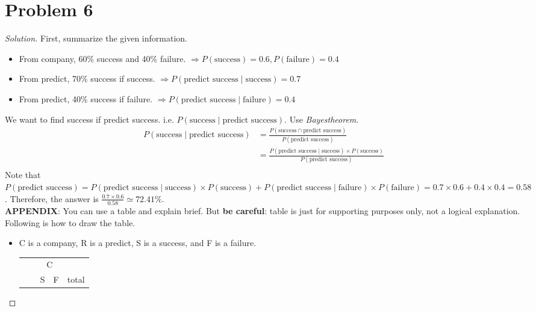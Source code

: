 \section*{Problem 6}
	\begin{proof} [Solution]
		First, summarize the given information.
		\begin{itemize}
			\item From company, 60\% success and 40\% failure. $\Rightarrow P(\mbox{success}) = 0.6, P(\mbox{failure}) = 0.4$
			\item From predict, 70\% success if success. $\Rightarrow P(\mbox{predict success} \mid\mbox{success}) = 0.7$
			\item From predict, 40\% success if failure. $\Rightarrow P(\mbox{predict success} \mid\mbox{failure}) = 0.4$
		\end{itemize}
		We want to find success if predict success. i.e. $P(\mbox{success} \mid\mbox{predict success})$. Use \textit{Bayes\textquotesingle theorem}.
		\begin{align*}
			P(\mbox{success} \mid\mbox{predict success}) &= \frac{P(\mbox{success}\cap\mbox{predict success})}{P(\mbox{predict success})}\\
			&= \frac{P(\mbox{predict success} \mid\mbox{success})\times P(\mbox{success})}{P(\mbox{predict success})}\\
		\end{align*}
		Note that $P(\mbox{predict success}) = P(\mbox{predict success} \mid\mbox{success})\times P(\mbox{success}) + P(\mbox{predict success} \mid\mbox{failure})\times P(\mbox{failure}) = 0.7\times0.6 + 0.4\times0.4 = 0.58$. Therefore, the answer is $\frac{0.7\times0.6}{0.58} \simeq 72.41\%$.\\
		{\color{cyan}\textbf{APPENDIX}}:\label{APPENDIX} You can use a table and explain brief. But \textbf{be careful}: table is just for supporting purposes only, not a logical explanation. Following is how to draw the table.
		\begin{itemize}
			\item [] C is a company, R is a predict, S is a success, and F is a failure.
				\begin{table}[htb!]
					\setlength{\tabcolsep}{15pt}
					\renewcommand{\arraystretch}{2}
					\centering
					\begin{tabular}{ccccc}
						&                            & \multicolumn{2}{c}{C}      &       \\
						& \multicolumn{1}{c|}{}      & S & \multicolumn{1}{c|}{F} & total \\ \cline{2-5} 

\end{tabular}
\end{table}
\end{itemize}
\end{proof}
